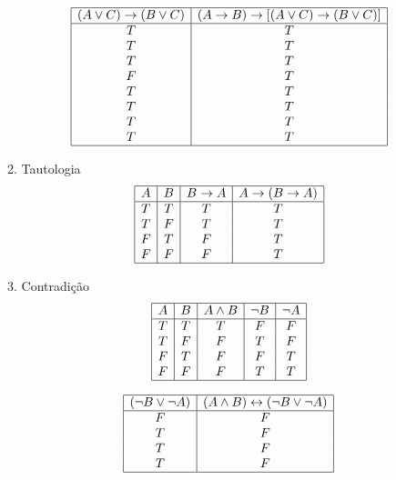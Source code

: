 \begin{enumerate}
\begin{enumerate}
			\[\begin{array}{|c|c|}
			\hline
			(A \lor C) \to (B \lor C) & (A \to B) \to [(A \lor C) \to (B \lor C)] \\ \hline
			T & T \\
			T & T \\
			T & T \\
			F & T \\
			T & T \\
			T & T \\
			T & T \\
			T & T \\
			\hline
			\end{array}
			\]
			
			\item Tautologia
			\[\begin{array}{|c|c|c|c|}
			\hline
			A & B & B \to A & A \to (B \to A) \\ \hline
			T & T & T & T \\
			T & F & T & T \\
			F & T & F & T \\
			F & F & F & T \\
			\hline
			\end{array}
			\]
			
			\item Contradi\c{c}\~ao
			\[\begin{array}{|c|c|c|c|c|}
			\hline
			A & B & A \land B & \neg B & \neg A \\ \hline
			T & T & T & F & F \\
			T & F & F & T & F \\
			F & T & F & F & T \\
			F & F & F & T & T \\
			\hline
			\end{array}
			\]
			
			\[\begin{array}{|c|c|}
			\hline
			(\neg B \lor \neg A) & (A \land B) \leftrightarrow (\neg B \lor \neg A) \\ \hline
			F & F \\
			T & F \\
			T & F \\
			T & F \\
			\hline
			\end{array}
			\]
			

\end{enumerate}
\end{enumerate}
